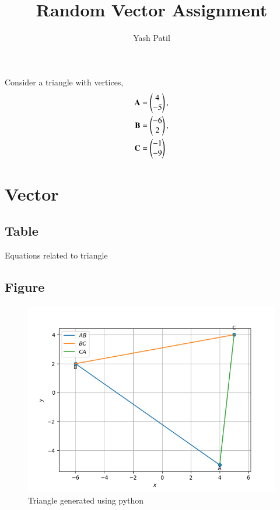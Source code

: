 \documentclass[journal,12pt,onecolumn]{IEEEtran}
\theoremstyle{remark}
\begin{document}
%




\vspace{3cm}

\title{
Random Vector Assignment
}
\author{ Yash Patil
}	
\maketitle

\renewcommand{\thefigure}{\theenumi}
\renewcommand{\thetable}{\theenumi}

Consider a triangle with vertices,\\
\begin{align}
	\mathbf{A} &= \begin{pmatrix}4\\-5\end{pmatrix} ,\\ \mathbf{B} &= \begin{pmatrix}-6\\2\end{pmatrix} ,\\ \mathbf{C} &= \begin{pmatrix}-1\\-9\end{pmatrix}
\end{align}
\section{Vector}
\subsection{Table}
\begin{table}[!htb]
	
	\caption{Equations related to triangle}
	\label{tab58:equations_vector}	
\end{table}
\subsection{Figure}
\begin{figure}[!htb]
	\centering
	\includegraphics[width=\columnwidth]{figs/1.png}
	\caption{Triangle generated using python}
	\label{fig58:Triangle}	
\end{figure}
\end{document}
